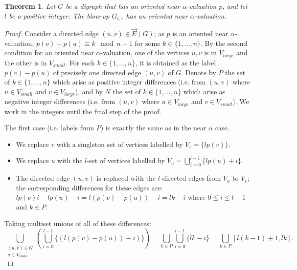 \documentclass[12pt, a4paper]{article}
\newtheorem{theorem}{Theorem}[section]
\theoremstyle{definition}
\begin{document}
\begin{theorem}\label{orblowsmall}
    Let $G$ be a digraph that has an oriented near $\alpha$-valuation $p$, and let $l$ be a positive integer. The blow-up $G_{l,1}$ has an oriented near $\alpha$-valuation.
\end{theorem}
\begin{proof}

Consider a directed edge $(u,v) \in \overrightarrow{E}(G)$; as $p$ is an oriented near $\alpha$-valuation, 
$p(v)-p(u) \equiv k \mod n+1$
for some $k\in \{1,\ldots,n\}$.  By the second condition for an oriented near $\alpha$-valuation, one of the vertices $u,v$ is in $V_{large}$ and the other is in $V_{small}$. For each $k \in \{1,\ldots,n\}$, it is obtained as the label $p(v)-p(u)$ of precisely one directed edge $(u,v)$ of $G$.  Denote by $P$ the set of $k\in \{1,\ldots,n\}$ which arise as positive integer differences (i.e. from $(u,v)$ where $u \in V_{small}$ and $v \in V_{large}$), and by $N$ the set of $k \in \{1,\ldots,n\}$ which arise as negative integer differences (i.e. from $(u,v)$ where $u \in V_{large}$ and $v \in V_{small}$).  We work in the integers until the final step of the proof.

The first case (i.e. labels from $P$) is exactly the same as in the near $\alpha$ case. 
\begin{itemize}
\item We replace $v$ with a singleton set of vertices labelled by $V_v=\{lp(v)\}$.
\item We replace $u$ with the $l$-set of vertices labelled by $V_u = \bigcup_{i=0}^{l-1}\{lp(u)+i\}$.
\item The directed edge $(u,v)$ is replaced with the $l$ directed edges from $V_u$ to $V_v$; the corresponding differences for these edges are:
$lp(v)i-lp(u)-i =  l(p(v)-p(u))-i = lk-i$
where $0 \leq i \leq l-1$ and $k \in P$. 
\end{itemize}

Taking multiset unions of all of these differences:
\[
\bigcup_{\substack{(u,v) \in G \\ u \in V_{small}}} \left( \bigcup_{i=0}^{l-1} \{ (l(p(v)-p(u))-i) \} \right)
= \bigcup_{k\in P} \bigcup_{i=0}^{l-1} \{ lk-i \} = \bigcup_{k \in P}[l(k-1)+1,lk]. 
\]


\end{proof}
\end{document}
